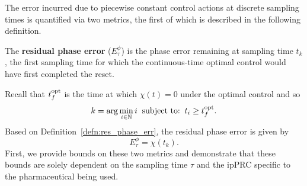 The error incurred due to piecewise constant control actions at discrete sampling times is quantified via two metrics, the first of which is described in the following definition.
\begin{defn}
	\label{defn:res_phase_err}
The \textbf{residual phase error} ($E^{\phi}_\tau$) is the phase error remaining at sampling time $t_k$, the first sampling time for which the continuous-time optimal control would have first completed the reset.
\end{defn}

Recall that $t^{\rm{opt}}_f$ is the time at which $\chi(t)=0$ under the optimal control and so
\begin{equation} k = \arg\min\limits_{i\in\mathbb{N}} i\;\; \text{subject to:}\;\; t_i\geq t_f^{\rm opt}.
\end{equation}
Based on Definition~\ref{defn:res_phase_err}, the residual phase error is given by
\begin{equation}
    E^{\phi}_\tau = \chi(t_k).
\end{equation}
First, we provide bounds on these two metrics and demonstrate that these bounds are solely dependent on the sampling time $\tau$ and the ipPRC specific to the pharmaceutical being used.


